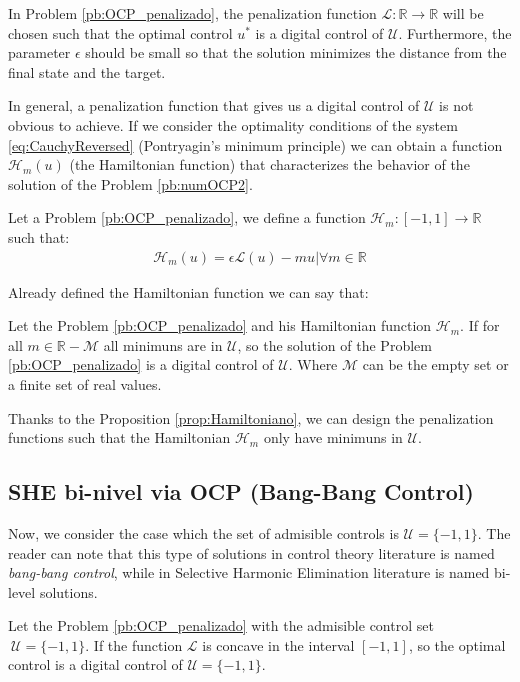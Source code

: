 In Problem \ref{pb:OCP_penalizado}, the penalization function $\mathcal L: \mathbb{R} \rightarrow \mathbb{R}$ will be chosen such that the optimal control $u^*$ is a digital control of $\mathcal{U}$. Furthermore, the parameter $\epsilon$ should be small so that the solution minimizes the distance from the final state and the target.

In general, a penalization function that gives us a digital control of $ \mathcal {U} $ is not obvious to achieve. If we consider the optimality conditions of the system \eqref{eq:CauchyReversed} (Pontryagin's minimum principle) we can obtain a function $ \mathcal{H}_m (u) $ (the Hamiltonian function) that characterizes the behavior of the solution of the Problem \ref{pb:numOCP2}.

\vspace{1em}
\begin{definition}[Hamiltonian]\label{def:Hamiltonian}
    Let a Problem \ref{pb:OCP_penalizado}, we define a function $\mathcal{H}_m:[-1,1]\rightarrow \mathbb{R}$ such that:
    \begin{gather}\label{Hm}
        \mathcal{H}_m(u) = \epsilon \mathcal{L}(u) - mu  |  \forall m \in \mathbb{R}
    \end{gather}
\end{definition}

Already defined the Hamiltonian function we can say that:

\vspace{1em}
\begin{proposition}\label{prop:Hamiltoniano}
    Let the Problem \ref{pb:OCP_penalizado} and his Hamiltonian function $\mathcal{H}_m$. If for all $m \in \mathbb{R} - \mathcal{M}$ all minimuns are in $\mathcal{U}$, so the solution of the Problem \ref{pb:OCP_penalizado} is a digital control of $\mathcal{U}$. Where $\mathcal{M}$ can be the empty set or a finite set of real values.  
\end{proposition}

Thanks to the Proposition \ref{prop:Hamiltoniano}, we can design the penalization functions such that the Hamiltonian $\mathcal{H}_m$ only have minimuns in $\mathcal{U}$.

\subsection{SHE bi-nivel via OCP (Bang-Bang Control)} 

Now, we consider the case which the set of admisible controls is  $\mathcal{U}=\{-1,1\}$. The reader can note that this type of solutions in control theory literature is named \emph{bang-bang control}, while in Selective Harmonic Elimination literature is named bi-level solutions.
\vspace{1em}
\begin{theorem}\label{th:bang-bang}
    Let the Problem \ref{pb:OCP_penalizado} with the admisible control set  $ \ \mathcal{U} = \{-1,1\}$. If the function $\mathcal{L}$ is concave in the interval $[-1,1]$, so the optimal control is a digital control of $\mathcal{U} =  \{-1,1\}$.
\end{theorem}

